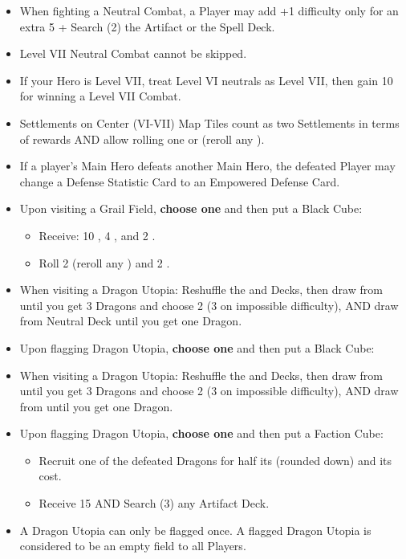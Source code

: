 \begin{multicols*}{2}
\begin{itemize}
  \item When fighting a Neutral Combat, a Player may add +1 difficulty only for an extra 5  + Search (2) the Artifact or the Spell Deck. %
  \item Level VII Neutral Combat cannot be skipped.
  \item If your Hero is Level VII, treat Level VI neutrals as Level VII, then gain 10  for winning a Level VII Combat. %
  \item Settlements on Center (VI-VII) Map Tiles count as two Settlements in terms of rewards AND allow rolling one  or  (reroll any ).
  \item If a player's Main Hero defeats another Main Hero, the defeated Player may change a Defense Statistic Card to an Empowered Defense Card. %
  \item Upon visiting a Grail Field, \textbf{choose one} and then put a Black Cube:
  \begin{itemize}
    \item Receive: 10 , 4 , and 2 .
    \item Roll 2  (reroll any ) and 2 .
  \end{itemize}
  \item When visiting a Dragon Utopia: Reshuffle the  and  Decks, then draw from  until you get 3 Dragons and choose 2 (3 on impossible difficulty), AND draw from  Neutral Deck until you get one Dragon.
  \item Upon flagging Dragon Utopia, \textbf{choose one} and then put a Black Cube: 
  \item When visiting a Dragon Utopia: Reshuffle the  and  Decks, then draw from  until you get 3 Dragons and choose 2 (3 on impossible difficulty), AND draw from  until you get one Dragon.
  \item Upon flagging Dragon Utopia, \textbf{choose one} and then put a Faction Cube:

  \begin{itemize}
    \item Recruit one of the defeated Dragons for half its  (rounded down) and its  cost.
    \item Receive 15  AND Search (3) any Artifact Deck.
  \end{itemize}
  \item A Dragon Utopia can only be flagged once. A flagged Dragon Utopia is considered to be an empty field to all Players. %
\end{itemize}


\end{multicols*}
